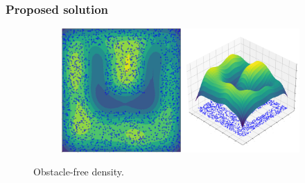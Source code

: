 \documentclass{beamer}
\begin{document}
\begin{frame}
	\frametitle{Proposed solution}	
	\begin{figure}[!ht]
		\centering  
		\begin{subfigure}[b]{1\textwidth}
			\includegraphics[width=\textwidth]{figChap4/GKDE_freeU.pdf} 
		\end{subfigure}
		\caption{Obstacle-free density.} 
	  \end{figure}
\end{frame}	
\end{document}
